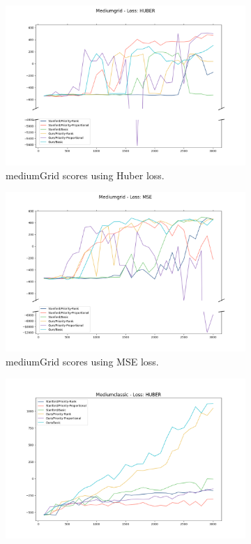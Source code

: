 \documentclass[conference]{IEEEtran}
\begin{document}
\begin{figure}
\begin{subfigure}[b]{0.475\textwidth}
        \includegraphics[width=\textwidth]{figures/medium/testing_mediumgrid_huber.png}
        \caption{mediumGrid scores using Huber loss.}
        \label{fig:mediumgrid_huber}
    \end{subfigure}
    \hfill
    \begin{subfigure}[b]{0.475\textwidth}
        \centering
        \includegraphics[width=\textwidth]{figures/medium/testing_mediumgrid_mse.png}
        \caption{mediumGrid scores using MSE loss.}
        \label{fig:mediumgrid_mse}
    \end{subfigure}
    \begin{subfigure}[b]{0.475\textwidth}
        \centering
        \includegraphics[width=\textwidth]{figures/mediumclassic/testing_mediumclassic_huber.png}

\end{subfigure}
\end{figure}
\end{document}
